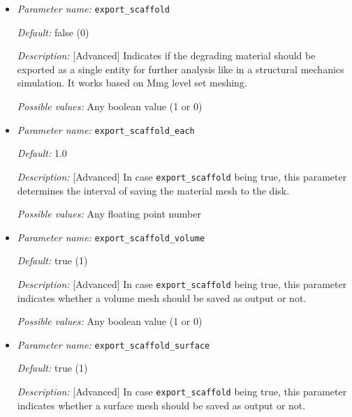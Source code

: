 \begin{itemize}
\item {\it Parameter name:} {\tt export\_scaffold}
\label{parameters:export_scaffold}


{\it Default:} false (0)

{\it Description:} [Advanced] Indicates if the degrading material should be exported as a single entity for further analysis like in a structural mechanics simulation. It works based on Mmg level set meshing.

{\it Possible values:} Any boolean value (1 or 0)


\item {\it Parameter name:} {\tt export\_scaffold\_each}
\label{parameters:export_scaffold_each}


{\it Default:} 1.0

{\it Description:} [Advanced] In case {\tt export\_scaffold} being true, this parameter determines the interval of saving the material mesh to the disk.

{\it Possible values:} Any floating point number


\item {\it Parameter name:} {\tt export\_scaffold\_volume}
\label{parameters:export_scaffold_volume}


{\it Default:} true (1)

{\it Description:} [Advanced] In case {\tt export\_scaffold} being true, this parameter indicates whether a volume mesh should be saved as output or not.

{\it Possible values:} Any boolean value (1 or 0)


\item {\it Parameter name:} {\tt export\_scaffold\_surface}
\label{parameters:export_scaffold_surface}


{\it Default:} true (1)

{\it Description:} [Advanced] In case {\tt export\_scaffold} being true, this parameter indicates whether a surface mesh should be saved as output or not.


\end{itemize}
